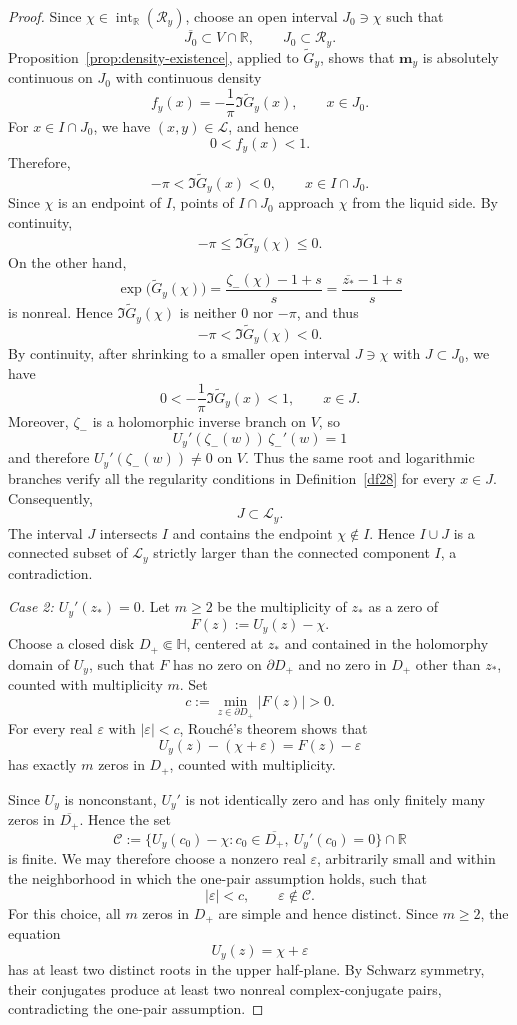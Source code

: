 \documentclass[11pt]{amsart}
\theoremstyle{plain}
\numberwithin{equation}{section}
\numberwithin{theorem}{section}
\numberwithin{figure}{section}
\begin{document}
\begin{proof}
Since \(\chi\in\operatorname{int}_{\mathbb R}(\mathcal R_y)\), choose an
open interval \(J_0\ni\chi\) such that
\[
    \overline{J_0}\subset V\cap\mathbb R,
    \qquad
    J_0\subset\mathcal R_y.
\]
Proposition~\ref{prop:density-existence}, applied to
\(\widetilde G_y\), shows that \(\mathbf m_y\) is absolutely continuous on
\(J_0\) with continuous density
\[
    f_y(x)
    =
    -\frac{1}{\pi}\Im\widetilde G_y(x),
    \qquad x\in J_0.
\]
For \(x\in I\cap J_0\), we have \((x,y)\in\mathcal L\), and hence
\[
    0<f_y(x)<1.
\]
Therefore,
\[
    -\pi<\Im\widetilde G_y(x)<0,
    \qquad x\in I\cap J_0.
\]
Since \(\chi\) is an endpoint of \(I\), points of \(I\cap J_0\) approach
\(\chi\) from the liquid side. By continuity,
\[
    -\pi\leq\Im\widetilde G_y(\chi)\leq0.
\]
On the other hand,
\[
    \exp\bigl(\widetilde G_y(\chi)\bigr)
    =
    \frac{\zeta_-(\chi)-1+s}{s}
    =
    \frac{\overline{z_*}-1+s}{s}
\]
is nonreal. Hence \(\Im\widetilde G_y(\chi)\) is neither \(0\) nor
\(-\pi\), and thus
\[
    -\pi<\Im\widetilde G_y(\chi)<0.
\]
By continuity, after shrinking to a smaller open interval
\(J\ni\chi\) with \(J\subset J_0\), we have
\[
    0<-\frac{1}{\pi}\Im\widetilde G_y(x)<1,
    \qquad x\in J.
\]
Moreover, \(\zeta_-\) is a holomorphic inverse branch on \(V\), so
\[
    U_y'(\zeta_-(w))\,\zeta_-'(w)=1
\]
and therefore \(U_y'(\zeta_-(w))\neq0\) on \(V\). Thus the same root and
logarithmic branches verify all the regularity conditions in
Definition~\ref{df28} for every \(x\in J\). Consequently,
\[
    J\subset\mathcal L_y.
\]
The interval \(J\) intersects \(I\) and contains the endpoint
\(\chi\notin I\). Hence \(I\cup J\) is a connected subset of
\(\mathcal L_y\) strictly larger than the connected component \(I\), a
contradiction.

\medskip
\noindent\emph{Case 2: \(U_y'(z_*)=0\).}
Let \(m\geq2\) be the multiplicity of \(z_*\) as a zero of
\[
    F(z):=U_y(z)-\chi.
\]
Choose a closed disk \(D_+\Subset\mathbb H\), centered at \(z_*\) and
contained in the holomorphy domain of \(U_y\), such that \(F\) has no zero
on \(\partial D_+\) and no zero in \(D_+\) other than \(z_*\), counted with
multiplicity \(m\). Set
\[
    c:=\min_{z\in\partial D_+}|F(z)|>0.
\]
For every real \(\varepsilon\) with \(|\varepsilon|<c\), Rouch\'e's theorem
shows that
\[
    U_y(z)-(\chi+\varepsilon)=F(z)-\varepsilon
\]
has exactly \(m\) zeros in \(D_+\), counted with multiplicity.

Since \(U_y\) is nonconstant, \(U_y'\) is not identically zero and has only
finitely many zeros in \(\overline{D_+}\). Hence the set
\[
    \mathcal C
    :=
    \bigl\{
        U_y(c_0)-\chi:
        c_0\in\overline{D_+},\ U_y'(c_0)=0
    \bigr\}
    \cap\mathbb R
\]
is finite. We may therefore choose a nonzero real \(\varepsilon\),
arbitrarily small and within the neighborhood in which the one-pair
assumption holds, such that
\[
    |\varepsilon|<c,
    \qquad
    \varepsilon\notin\mathcal C.
\]
For this choice, all \(m\) zeros in \(D_+\) are simple and hence distinct.
Since \(m\geq2\), the equation
\[
    U_y(z)=\chi+\varepsilon
\]
has at least two distinct roots in the upper half-plane. By Schwarz
symmetry, their conjugates produce at least two nonreal complex-conjugate
pairs, contradicting the one-pair assumption.


\end{proof}
\end{document}
